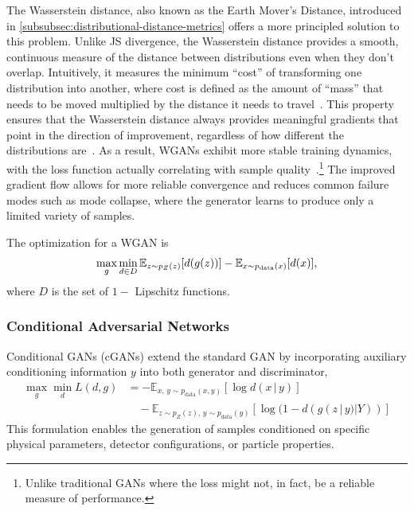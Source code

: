         The Wasserstein distance, also known as the Earth Mover's Distance, introduced in \cref{subsubsec:distributional-distance-metrics} offers a more principled solution to this problem.
        Unlike JS divergence, the Wasserstein distance provides a smooth, continuous measure of the distance between distributions even when they don't overlap.
        Intuitively, it measures the minimum ``cost'' of transforming one distribution into another, where cost is defined as the amount of ``mass'' that needs to be moved multiplied by the distance it needs to travel~\cite{villani_wasserstein_2009}.
        This property ensures that the Wasserstein distance always provides meaningful gradients that point in the direction of improvement, regardless of how different the distributions are~\cite{arjovsky_wasserstein_2017}.
        As a result, WGANs exhibit more stable training dynamics, with the loss function actually correlating with sample quality~\cite{stephanovitch_optimal_2023, carrazza_lund_2019, buhmann_hadrons_2021}.\footnote{Unlike traditional GANs where the loss might not, in fact, be a reliable measure of performance.}
        The improved gradient flow allows for more reliable convergence and reduces common failure modes such as mode collapse, where the generator learns to produce only a limited variety of samples.

        The optimization for a WGAN is
        \begin{equation}
            \max_g\min_{d\in D}\mathbb{E}_{z\sim p_Z(z)} \qty[d(g(z))] - \mathbb{E}_{x\sim p_{\text{data}}(x)} \qty[d(x)],
        \end{equation}
        where $D$ is the set of \(1-\) Lipschitz functions.
    \subsubsection{Conditional Adversarial Networks}
       Conditional GANs (cGANs) extend the standard GAN by incorporating auxiliary conditioning information \(y\) into both generator and discriminator,
        \begin{equation}
            \begin{split}
                \max_g \min_d L(d, g) &= -\mathbb{E}_{x,\,y \sim p_{\text{data}}(x,y)}[\log d(x\,|\,y)] \\
                &\quad - \mathbb{E}_{z \sim p_Z(z),\,y \sim p_{\text{data}}(y)}[\log(1 - d(g(z\,|\,y) | Y))]
            \end{split}
        \end{equation}
        This formulation enables the generation of samples conditioned on specific physical parameters, detector configurations, or particle properties.
        

